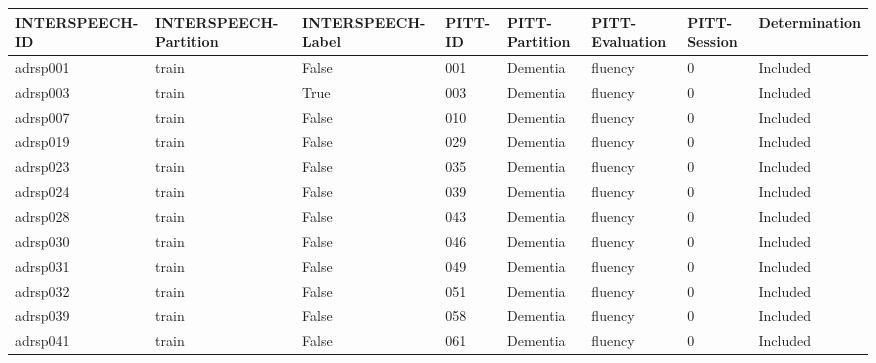\begin{center}
\tiny
\begin{longtable}{|l|l|l|l|l|l|l|l|}
\hline
INTERSPEECH-ID & INTERSPEECH-Partition & INTERSPEECH-Label & PITT-ID & PITT-Partition & PITT-Evaluation & PITT-Session & Determination \\ \hline
adrsp001       & train                 & False             & 001     & Dementia       & fluency         & 0            & Included      \\ \hline
adrsp003       & train                 & True              & 003     & Dementia       & fluency         & 0            & Included      \\ \hline
adrsp007       & train                 & False             & 010     & Dementia       & fluency         & 0            & Included      \\ \hline
adrsp019       & train                 & False             & 029     & Dementia       & fluency         & 0            & Included      \\ \hline
adrsp023       & train                 & False             & 035     & Dementia       & fluency         & 0            & Included      \\ \hline
adrsp024       & train                 & False             & 039     & Dementia       & fluency         & 0            & Included      \\ \hline
adrsp028       & train                 & False             & 043     & Dementia       & fluency         & 0            & Included      \\ \hline
adrsp030       & train                 & False             & 046     & Dementia       & fluency         & 0            & Included      \\ \hline
adrsp031       & train                 & False             & 049     & Dementia       & fluency         & 0            & Included      \\ \hline
adrsp032       & train                 & False             & 051     & Dementia       & fluency         & 0            & Included      \\ \hline
adrsp039       & train                 & False             & 058     & Dementia       & fluency         & 0            & Included      \\ \hline
adrsp041       & train                 & False             & 061     & Dementia       & fluency         & 0            & Included      \\ \hline

\end{longtable}
\end{center}
